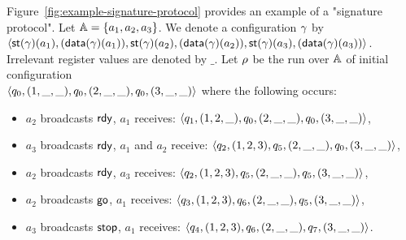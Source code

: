 \begin{example}
\label{ex:protocol-signature}
	Figure~\ref{fig:example-signature-protocol} provides an example of a "signature protocol".
Let $\mathbb{A} = \{a_1, a_2,a_3\}$. We denote a configuration $\gamma$ by $\langle \mathsf{st}(\gamma)(a_1),(\mathsf{data}(\gamma)(a_1)), \\ \mathsf{st}(\gamma)(a_2),(\mathsf{data}(\gamma)(a_2)), \mathsf{st}(\gamma)(a_3), (\mathsf{data}(\gamma)(a_3)) \rangle$. Irrelevant register values are denoted by $\_$. Let $\rho$ be the run over $\mathbb{A}$ of initial configuration  \\$\langle q_0, (1,\_,\_), q_0, (2,\_,\_), q_0, (3,\_,\_) \rangle$ where the following occurs:
\begin{itemize}
\item $a_2$ broadcasts $\textsf{rdy}$, $a_1$ receives: $\langle q_1, (1,2,\_), q_0, (2,\_,\_), q_0, (3,\_,\_) \rangle$,
\item $a_3$ broadcasts $\textsf{rdy}$, $a_1$ and $a_2$ receive: $\langle q_2, (1,2,3), q_5, (2,\_,\_), q_0, (3,\_,\_) \rangle$,
\item $a_2$ broadcasts $\textsf{rdy}$, $a_3$ receives: $\langle q_2, (1,2,3), q_5, (2,\_,\_), q_5, (3,\_,\_) \rangle$,
\item $a_2$ broadcasts $\textsf{go}$, $a_1$ receives: $\langle q_3, (1,2,3), q_6, (2,\_,\_), q_5, (3,\_,\_) \rangle$,
\item $a_3$ broadcasts $\textsf{stop}$, $a_1$ receives: $\langle q_4, (1,2,3), q_6, (2,\_,\_), q_7, (3,\_,\_) \rangle$.
\end{itemize}
	

\end{example}
